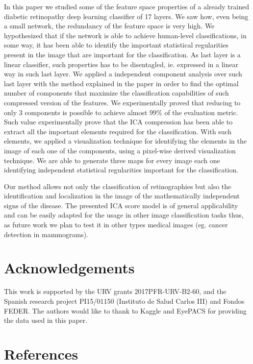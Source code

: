 \documentclass[review]{elsarticle}
\theoremstyle{definition} %
\theoremstyle{remark}
\begin{document}
In this paper we studied some of the feature space properties of a already trained diabetic retinopathy deep learning classifier of 17 layers. We saw how, even being a small network, the redundancy of the feature space is very high. We hypothesized that if the network is able to achieve human-level classifications, in some way, it has been able to identify the important statistical regularities present in the image that are important for the classification. As last layer is a linear classifier, such properties has to be disentagled, ie. expressed in a linear way in such last layer. We applied a independent component analysis over such last layer with the method explained in the paper in order to find the optimal number of components that maximize the classification capabilities of such compressed version of the features. We experimentally proved that reducing to only 3 components is possible to achieve almost $99\%$ of the evaluation metric. Such value experimentally prove that the ICA compression has been able to extract all the important elements required for the classification. With such elements, we applied a visualization technique for identifying the elements in the image of each one of the components, using a pixel-wise derived visualization technique. We are able to generate three maps for every image each one identifying independent statistical regularities important for the classification.

Our method allows not only the classification of retinographies but also the identification and localization in the image of the mathematically independent signs of the disease. The presented ICA score model is of general applicability and can be easily adapted for the usage in other image classification tasks thus, as future work we plan to test it in other types medical images (eg. cancer detection in mammograms).

\section*{Acknowledgements}

This work is supported by the URV grants 2017PFR-URV-B2-60, and the Spanish research project PI15/01150 (Instituto de Salud Carlos III) and Fondos FEDER. The authors would like to thank to Kaggle and EyePACS for providing the data used in this paper.

\section*{References}


\end{document}
